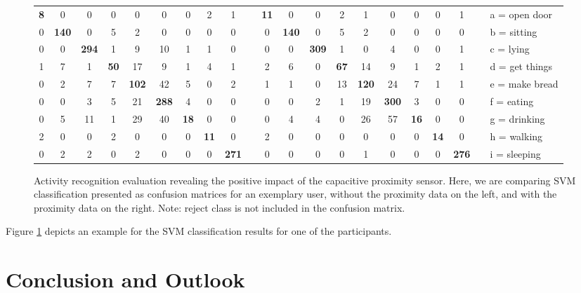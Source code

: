 \documentclass[runningheads,a4paper]{llncs}
\begin{document}
\begin{figure}
\begin{scriptsize}
\begin{tabular}{|ccccccccc|p{0.01cm}|ccccccccc|p{0.01cm}|l}
		\textbf{8} & 0 & 0 & 0 & 0 & 0 & 0 & 2 & 1				&& \textbf{11} & 0 & 0 & 2 & 1 & 0 & 0 & 0 & 1 		&& a = open door	\\ 
		0 & \textbf{140} & 0 & 5 & 2 & 0 & 0 & 0 & 0  		&& 0 & \textbf{140} & 0 & 5 & 2 & 0 & 0 & 0 & 0 	&&  b = sitting		\\ 
		0 & 0 & \textbf{294} & 1 & 9 & 10 & 1 & 1 & 0 	 	&& 0 & 0 & \textbf{309} & 1 & 0 & 4 & 0 & 0 & 1 	&& c = lying		\\ 
		1 & 7 & 1 & \textbf{50} & 17 & 9 & 1 & 4 & 1	 		&& 2 & 6 & 0 & \textbf{67} & 14 & 9 & 1 & 2 & 1 	&& d = get things	\\ 
		0 & 2 & 7 & 7 & \textbf{102} & 42 & 5 & 0 & 2			&& 1 & 1 & 0 & 13 & \textbf{120} & 24 & 7 & 1 & 1 && e = make bread	\\ 
		0 & 0 & 3 & 5 & 21 & \textbf{288} & 4 & 0 & 0 	 	&& 0 & 0 & 2 & 1 & 19 & \textbf{300} & 3 & 0 & 0 	&& f = eating		\\ 
		0 & 5 & 11 & 1 & 29 & 40 & \textbf{18} & 0 & 0	 	&& 0 & 4 & 4 & 0 & 26 & 57 & \textbf{16} & 0 & 0	&& g = drinking		\\
		2 & 0 & 0 & 2 & 0 & 0 & 0 & \textbf{11} & 0	 			&& 2 & 0 & 0 & 0 & 0 & 0 & 0 & \textbf{14} & 0 		&& h = walking		\\
		0 & 2 & 2 & 0 & 2 & 0 & 0 & 0 & \textbf{271}			&& 0 & 0 & 0 & 0 & 1 & 0 & 0 & 0 & \textbf{276} 		&& i = sleeping		\\ 


		\cline{1-9} \cline{11-19} 
	\end{tabular}
	\end{scriptsize}
	
	\caption{Activity recognition evaluation revealing the positive impact of the capacitive proximity sensor. Here, we are comparing SVM classification presented as confusion matrices for an exemplary user, without the proximity data on the left, and with the proximity data on the right. Note: reject class is not included in the confusion matrix.}
	
	\label{fig:ConfusionMatrixForAnExemplaryUser}
\end{figure}

Figure \ref{fig:ConfusionMatrixForAnExemplaryUser} depicts an example for the SVM classification results for one of the participants.

\section{Conclusion and Outlook}
\label{sect:conclusions}
\end{document}
